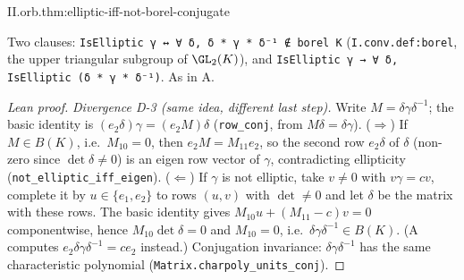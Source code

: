 \begin{theorem}
\end{theorem}
\begin{tfformal}{II.orb.thm:elliptic-iff-not-borel-conjugate}
\begin{tffidelity}
Two clauses: \texttt{IsElliptic γ ↔ ∀ δ, δ * γ * δ⁻¹ ∉ borel K} (\texttt{I.conv.def:borel}, the upper triangular subgroup of $\GL_2(K)$), and \texttt{IsElliptic γ → ∀ δ, IsElliptic (δ * γ * δ⁻¹)}. As in A.
\end{tffidelity}
\end{tfformal}
\begin{proof}[Lean proof]
\emph{Divergence D-3 (same idea, different last step).} Write $M=\delta\gamma\delta^{-1}$; the basic identity is $(e_2\delta)\gamma=(e_2M)\delta$ (\texttt{row\_conj}, from $M\delta=\delta\gamma$). ($\Rightarrow$) If $M\in B(K)$, i.e.\ $M_{10}=0$, then $e_2M=M_{11}e_2$, so the second row $e_2\delta$ of $\delta$ (non-zero since $\det\delta\ne0$) is an eigen row vector of $\gamma$, contradicting ellipticity (\texttt{not\_elliptic\_iff\_eigen}). ($\Leftarrow$) If $\gamma$ is not elliptic, take $v\ne0$ with $v\gamma=cv$, complete it by $u\in\{e_1,e_2\}$ to rows $(u,v)$ with $\det\ne0$ and let $\delta$ be the matrix with these rows. The basic identity gives $M_{10}u+(M_{11}-c)v=0$ componentwise, hence $M_{10}\det\delta=0$ and $M_{10}=0$, i.e.\ $\delta\gamma\delta^{-1}\in B(K)$. (A computes $e_2\delta\gamma\delta^{-1}=ce_2$ instead.) Conjugation invariance: $\delta\gamma\delta^{-1}$ has the same characteristic polynomial (\texttt{Matrix.charpoly\_units\_conj}).
\end{proof}

